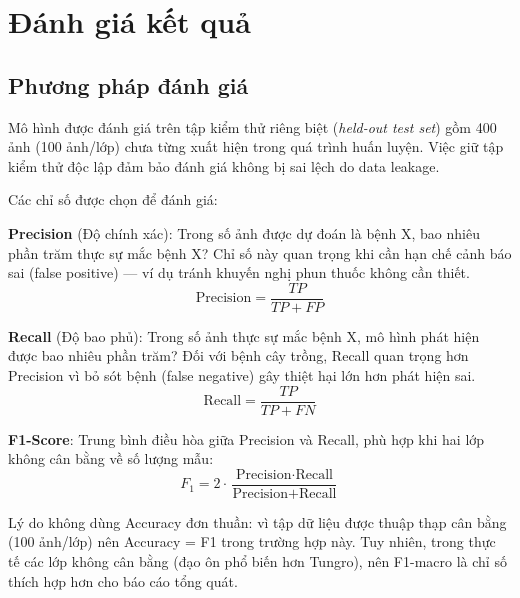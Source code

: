 \chapter{Đánh giá kết quả}

\section{Phương pháp đánh giá}
Mô hình được đánh giá trên tập kiểm thử riêng biệt (\textit{held-out test set}) gồm 400 ảnh (100 ảnh/lớp) chưa từng xuất hiện trong quá trình huấn luyện. Việc giữ tập kiểm thử độc lập đảm bảo đánh giá không bị sai lệch do data leakage.

Các chỉ số được chọn để đánh giá:

\textbf{Precision} (Độ chính xác): Trong số ảnh được dự đoán là bệnh X, bao nhiêu phần trăm thực sự mắc bệnh X? Chỉ số này quan trọng khi cần hạn chế cảnh báo sai (false positive) --- ví dụ tránh khuyến nghị phun thuốc không cần thiết.
\begin{equation}
    \text{Precision} = \frac{TP}{TP + FP}
\end{equation}

\textbf{Recall} (Độ bao phủ): Trong số ảnh thực sự mắc bệnh X, mô hình phát hiện được bao nhiêu phần trăm? Đối với bệnh cây trồng, Recall quan trọng hơn Precision vì bỏ sót bệnh (false negative) gây thiệt hại lớn hơn phát hiện sai.
\begin{equation}
    \text{Recall} = \frac{TP}{TP + FN}
\end{equation}

\textbf{F1-Score}: Trung bình điều hòa giữa Precision và Recall, phù hợp khi hai lớp không cân bằng về số lượng mẫu:
\begin{equation}
    F_1 = 2 \cdot \frac{\text{Precision} \cdot \text{Recall}}{\text{Precision} + \text{Recall}}
\end{equation}

Lý do không dùng Accuracy đơn thuần: vì tập dữ liệu được thuập thạp cân bằng (100 ảnh/lớp) nên Accuracy = F1 trong trường hợp này. Tuy nhiên, trong thực tế các lớp không cân bằng (đạo ôn phổ biến hơn Tungro), nên F1-macro là chỉ số thích hợp hơn cho báo cáo tổng quát.

